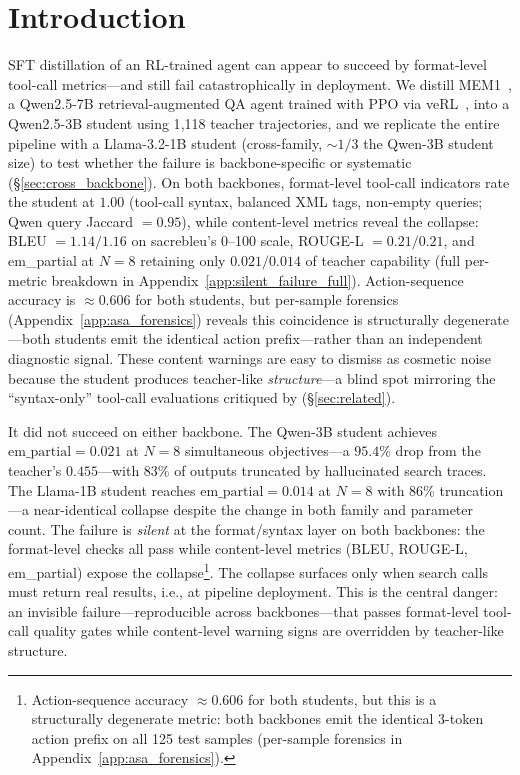 \section{Introduction}
\label{sec:intro}

SFT distillation of an RL-trained agent can appear to succeed by format-level tool-call metrics---and still fail catastrophically in deployment. We distill MEM1~\cite{zhou2025mem1}, a Qwen2.5-7B retrieval-augmented QA agent trained with PPO via veRL~\cite{sheng2024verl}, into a Qwen2.5-3B student using 1{,}118 teacher trajectories, and we replicate the entire pipeline with a Llama-3.2-1B student (cross-family, ${\sim}1/3$ the Qwen-3B student size) to test whether the failure is backbone-specific or systematic (\S\ref{sec:cross_backbone}). On both backbones, format-level tool-call indicators rate the student at $1.00$ (tool-call syntax, balanced XML tags, non-empty queries; Qwen query Jaccard $=0.95$), while content-level metrics reveal the collapse: BLEU $=1.14/1.16$ on sacrebleu's 0--100 scale, ROUGE-L $=0.21/0.21$, and em\_partial at $N\!=\!8$ retaining only $0.021/0.014$ of teacher capability (full per-metric breakdown in Appendix~\ref{app:silent_failure_full}). Action-sequence accuracy is $\approx 0.606$ for both students, but per-sample forensics (Appendix~\ref{app:asa_forensics}) reveals this coincidence is structurally degenerate---both students emit the identical action prefix---rather than an independent diagnostic signal. These content warnings are easy to dismiss as cosmetic noise because the student produces teacher-like \emph{structure}---a blind spot mirroring the ``syntax-only'' tool-call evaluations critiqued by \citet{jhandi2025slm} (\S\ref{sec:related}).

It did not succeed on either backbone. The Qwen-3B student achieves $\text{em\_partial} = 0.021$ at $N\!=\!8$ simultaneous objectives---a $95.4\%$ drop from the teacher's $0.455$---with 83\% of outputs truncated by hallucinated search traces. The Llama-1B student reaches $\text{em\_partial} = 0.014$ at $N\!=\!8$ with 86\% truncation---a near-identical collapse despite the change in both family and parameter count. The failure is \emph{silent} at the format/syntax layer on both backbones: the format-level checks all pass while content-level metrics (BLEU, ROUGE-L, em\_partial) expose the collapse\footnote{Action-sequence accuracy $\approx 0.606$ for both students, but this is a structurally degenerate metric: both backbones emit the identical 3-token action prefix on all 125 test samples (per-sample forensics in Appendix~\ref{app:asa_forensics}).}. The collapse surfaces only when search calls must return real results, i.e., at pipeline deployment. This is the central danger: an invisible failure---reproducible across backbones---that passes format-level tool-call quality gates while content-level warning signs are overridden by teacher-like structure.


